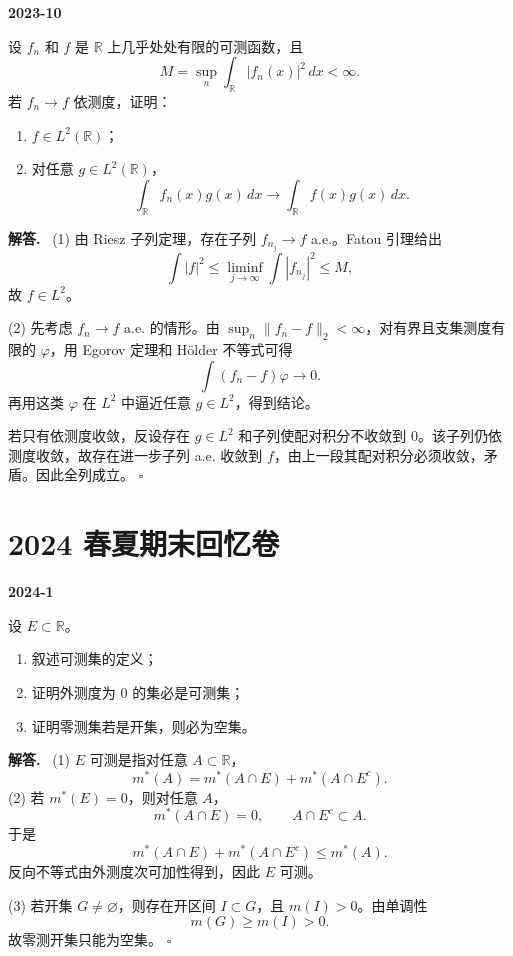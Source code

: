 \documentclass[UTF8]{ctexart}
\newcommand{\R}{\mathbb R}
\newenvironment{problem}[1]{\par\medskip\noindent\textbf{#1}\par\smallskip}{\par}
\newenvironment{solution}{\par\noindent\textbf{解答.}\ }{\hfill$\square$\par\medskip}
\begin{document}
\begin{problem}{2023-10}
设 \(f_n\) 和 \(f\) 是 \(\R\) 上几乎处处有限的可测函数，且
\[
  M=\sup_n\int_\R |f_n(x)|^2\,dx<\infty.
\]
若 \(f_n\to f\) 依测度，证明：
\begin{enumerate}[label=(\arabic*)]
  \item \(f\in L^2(\R)\)；
  \item 对任意 \(g\in L^2(\R)\)，
  \[
    \int_\R f_n(x)g(x)\,dx\to \int_\R f(x)g(x)\,dx.
  \]
\end{enumerate}
\end{problem}
\begin{solution}
(1) 由 Riesz 子列定理，存在子列 \(f_{n_j}\to f\) a.e.。Fatou 引理给出
\[
  \int |f|^2\le \liminf_{j\to\infty}\int |f_{n_j}|^2\le M,
\]
故 \(f\in L^2\)。

(2) 先考虑 \(f_n\to f\) a.e. 的情形。由 \(\sup_n\|f_n-f\|_2<\infty\)，对有界且支集测度有限的
\(\varphi\)，用 Egorov 定理和 Hölder 不等式可得
\[
  \int (f_n-f)\varphi\to0.
\]
再用这类 \(\varphi\) 在 \(L^2\) 中逼近任意 \(g\in L^2\)，得到结论。

若只有依测度收敛，反设存在 \(g\in L^2\) 和子列使配对积分不收敛到 \(0\)。该子列仍依测度收敛，故存在进一步子列 a.e. 收敛到 \(f\)，由上一段其配对积分必须收敛，矛盾。因此全列成立。
\end{solution}

\section{2024 春夏期末回忆卷}

\begin{problem}{2024-1}
设 \(E\subset\R\)。
\begin{enumerate}[label=(\arabic*)]
  \item 叙述可测集的定义；
  \item 证明外测度为 \(0\) 的集必是可测集；
  \item 证明零测集若是开集，则必为空集。
\end{enumerate}
\end{problem}
\begin{solution}
(1) \(E\) 可测是指对任意 \(A\subset\R\)，
\[
  m^*(A)=m^*(A\cap E)+m^*(A\cap E^c).
\]
(2) 若 \(m^*(E)=0\)，则对任意 \(A\)，
\[
  m^*(A\cap E)=0,\qquad A\cap E^c\subset A.
\]
于是
\[
  m^*(A\cap E)+m^*(A\cap E^c)\le m^*(A).
\]
反向不等式由外测度次可加性得到，因此 \(E\) 可测。

(3) 若开集 \(G\ne\varnothing\)，则存在开区间 \(I\subset G\)，且 \(m(I)>0\)。由单调性
\[
  m(G)\ge m(I)>0.
\]
故零测开集只能为空集。
\end{solution}
\end{document}
